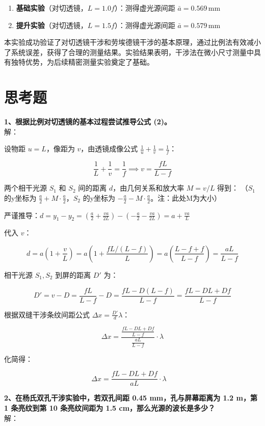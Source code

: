 \documentclass[12pt,a4paper]{article}
\begin{document}
\begin{enumerate}
    \item \textbf{基础实验}（对切透镜，$L = 1.0f$）：测得虚光源间距 $\bar{a} = 0.569 \, \text{mm}$
    \item \textbf{提升实验}（对切透镜，$L = 1.5f$）：测得虚光源间距 $\bar{a} = 0.579 \, \text{mm}$  
\end{enumerate}

本实验成功验证了对切透镜干涉和劳埃德镜干涉的基本原理，通过比例法有效减小了系统误差，获得了合理的测量结果。实验结果表明，干涉法在微小尺寸测量中具有独特优势，为后续精密测量实验奠定了基础。


\appendix
\section{思考题}
\textbf{1、根据比例对切透镜的基本过程尝试推导公式 (2)。}\\
解：

设物距 $u = L$，像距为 $v$，由透镜成像公式 $\frac{1}{u} + \frac{1}{v} = \frac{1}{f}$：

$$
\frac{1}{L} + \frac{1}{v} = \frac{1}{f} \implies v = \frac{fL}{L - f}
$$

两个相干光源 $S_1$ 和 $S_2$ 间的距离 $d$，由几何关系和放大率 $M = v/L$ 得到：
（$S_1$ 的y坐标为 $\frac{a}{2} + M \cdot \frac{a}{2}$，$S_2$ 的y坐标为 $-\frac{a}{2} - M \cdot \frac{a}{2}$。注：此处M为大小）

严谨推导：$d = y_1 - y_2 = \left(\frac{a}{2} + \frac{va}{2L}\right) - \left(-\frac{a}{2} - \frac{va}{2L}\right) = a + \frac{va}{L}$

代入 $v$：

$$
d = a \left( 1 + \frac{v}{L} \right) = a \left( 1 + \frac{fL / (L - f)}{L} \right) = a \left( \frac{L - f + f}{L - f} \right) = \frac{aL}{L - f}
$$

相干光源 $S_1, S_2$ 到屏的距离 $D'$ 为：

$$
D' = v - D = \frac{fL}{L - f} - D = \frac{fL - D(L - f)}{L - f} = \frac{fL - DL + Df}{L - f}
$$

根据双缝干涉条纹间距公式 $\Delta x = \frac{D'}{d} \lambda$：

$$
\Delta x = \frac{ \frac{fL - DL + Df}{L - f} }{ \frac{aL}{L - f} } \cdot \lambda
$$

化简得：

$$
\Delta x = \frac{fL - DL + Df}{aL} \cdot \lambda \quad 
$$

\textbf{2、在杨氏双孔干涉实验中，若双孔间距 0.45 mm，孔与屏幕距离为 1.2 m，第 1 条亮纹到第 10 条亮纹间距为 1.5 cm，那么光源的波长是多少？}\\
解：
\end{document}
